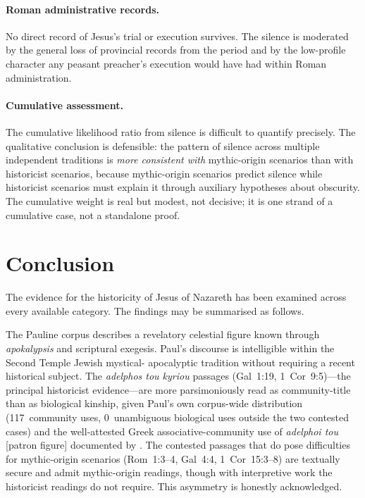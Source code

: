 \documentclass[12pt,oneside]{article}
\newcommand{\grk}[1]{\textit{#1}}
\begin{document}
\paragraph{Roman administrative records.}
No direct record of Jesus's trial or execution survives.  The
silence is moderated by the general loss of provincial records
from the period and by the low-profile character any peasant
preacher's execution would have had within Roman administration.

\paragraph{Cumulative assessment.}
The cumulative likelihood ratio from silence is difficult to
quantify precisely.  The qualitative conclusion is defensible:
the pattern of silence across multiple independent traditions is
\textit{more consistent with} mythic-origin scenarios than with
historicist scenarios, because mythic-origin scenarios predict
silence while historicist scenarios must explain it through
auxiliary hypotheses about obscurity.  The cumulative weight is
real but modest, not decisive; it is one strand of a cumulative
case, not a standalone proof.

\section{Conclusion}

The evidence for the historicity of Jesus of Nazareth has been
examined across every available category.  The findings may be
summarised as follows.

The Pauline corpus describes a revelatory celestial figure known
through \grk{apokalypsis} and scriptural exegesis.  Paul's
discourse is intelligible within the Second Temple Jewish mystical-
apocalyptic tradition without requiring a recent historical
subject.  The \grk{adelphos tou kyriou} passages
(Gal~1:19, 1~Cor~9:5)---the principal historicist evidence---are
more parsimoniously read as community-title than as biological
kinship, given Paul's own corpus-wide distribution (117~community
uses, 0~unambiguous biological uses outside the two contested
cases) and the well-attested Greek associative-community use of
\grk{adelphoi tou} [patron figure] documented by
\citet{Harland2005}.  The contested passages that do pose
difficulties for mythic-origin scenarios
(Rom~1:3--4, Gal~4:4, 1~Cor~15:3--8) are textually secure and
admit mythic-origin readings, though with interpretive work the
historicist readings do not require.  This asymmetry is honestly
acknowledged.
\end{document}
